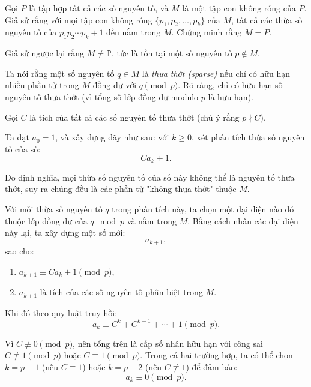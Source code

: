 \ifshowproblemandsoln
\ifshowproblem\begin{problem}\label{problem:USA-2015-TSTST-P3}\fi
\ifshowsoln\begin{problem}\fi
    Gọi \( P \) là tập hợp tất cả các số nguyên tố, và \( M \) là một tập con không rỗng của \( P \).  
    Giả sử rằng với mọi tập con không rỗng \( \{p_1, p_2, \ldots, p_k\} \) của \( M \),  
    tất cả các thừa số nguyên tố của \( p_1p_2\cdots p_k + 1 \) đều nằm trong \( M \).  
    Chứng minh rằng \( M = P \).
\end{problem}
\fi

\ifshowsoln
\begin{soln}\footnotemark
    Giả sử ngược lại rằng \( M \ne \mathbb{P} \), tức là tồn tại một số nguyên tố \( p \notin M \). 

    Ta nói rằng một số nguyên tố \( q \in M \) là \textit{thưa thớt (sparse)} nếu chỉ có hữu hạn nhiều phần tử trong \( M \) đồng dư với \( q \pmod{p} \). 
    Rõ ràng, chỉ có hữu hạn số nguyên tố thưa thớt (vì tổng số lớp đồng dư modulo \( p \) là hữu hạn).

    Gọi \( C \) là tích của tất cả các số nguyên tố thưa thớt (chú ý rằng \( p \nmid C \)).

    Ta đặt \( a_0 = 1 \), và xây dựng dãy như sau: với \( k \ge 0 \), xét phân tích thừa số nguyên tố của số:
    \[
        C a_k + 1.
    \]

    Do định nghĩa, mọi thừa số nguyên tố của số này không thể là nguyên tố thưa thớt, suy ra chúng đều là các phần tử "không thưa thớt" thuộc \( M \).

    Với mỗi thừa số nguyên tố \( q \) trong phân tích này, ta chọn một đại diện nào đó thuộc lớp đồng dư của \( q \mod p \) và nằm trong \( M \). 
    Bằng cách nhân các đại diện này lại, ta xây dựng một số mới:
    \[
        a_{k+1},
    \]
    sao cho:
    \begin{enumerate}[topsep=0pt, partopsep=0pt, itemsep=0pt, label=(\roman*)]
        \item \( a_{k+1} \equiv C a_k + 1 \pmod{p} \),
        \item \( a_{k+1} \) là tích của các số nguyên tố phân biệt trong \( M \).
    \end{enumerate}

    Khi đó theo quy luật truy hồi:
    \[
        a_k \equiv C^k + C^{k-1} + \cdots + 1 \pmod{p}.
    \]

    Vì \( C \not\equiv 0 \pmod{p} \), nên tổng trên là cấp số nhân hữu hạn với công sai \( C \not\equiv 1 \pmod{p} \) hoặc \( C \equiv 1 \pmod{p} \). 
    Trong cả hai trường hợp, ta có thể chọn \( k = p - 1 \) (nếu \( C \equiv 1 \)) hoặc \( k = p - 2 \) (nếu \( C \not\equiv 1 \)) để đảm bảo:
    \[
        a_k \equiv 0 \pmod{p}.
    \]


\end{soln}
\end{problem}
